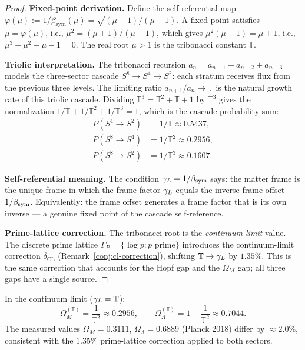 \begin{proof}
\textbf{Fixed-point derivation.}
Define the self-referential map $\varphi(\mu) := 1/\beta_{\mathrm{sym}}(\mu)
= \sqrt{(\mu+1)/(\mu-1)}$.
A fixed point satisfies $\mu = \varphi(\mu)$, i.e.,
$\mu^2 = (\mu+1)/(\mu-1)$, which gives $\mu^2(\mu-1) = \mu+1$, i.e.,
$\mu^3 - \mu^2 - \mu - 1 = 0$.
The real root $\mu > 1$ is the tribonacci constant $\mathbb{T}$.

\textbf{Triolic interpretation.}
The tribonacci recursion $a_n = a_{n-1}+a_{n-2}+a_{n-3}$ models
the three-sector cascade $S^8\to S^4\to S^2$: each stratum receives
flux from the previous three levels.
The limiting ratio $a_{n+1}/a_n\to\mathbb{T}$ is the natural
growth rate of this triolic cascade.
Dividing $\mathbb{T}^3 = \mathbb{T}^2+\mathbb{T}+1$ by $\mathbb{T}^3$
gives the normalization
$1/\mathbb{T}+1/\mathbb{T}^2+1/\mathbb{T}^3 = 1$,
which is the cascade probability sum:
\begin{align*}
  P(S^4\to S^2) &= 1/\mathbb{T} \approx 0.5437, \\
  P(S^8\to S^4) &= 1/\mathbb{T}^2 \approx 0.2956, \\
  P(S^8\to S^2) &= 1/\mathbb{T}^3 \approx 0.1607.
\end{align*}

\textbf{Self-referential meaning.}
The condition $\gamma_L = 1/\beta_{\mathrm{sym}}$ says: the matter frame is the unique frame
in which the frame factor $\gamma_L$ equals the inverse frame offset $1/\beta_{\mathrm{sym}}$.
Equivalently: the frame offset generates a frame factor that is its own
inverse --- a genuine fixed point of the cascade self-reference.

\textbf{Prime-lattice correction.}
The tribonacci root is the \emph{continuum-limit} value.
The discrete prime lattice $\Gamma_P = \{\log p : p\text{ prime}\}$
introduces the continuum-limit correction $\delta_{\mathrm{CL}}$
(Remark~\ref{conj:cl-correction}), shifting $\mathbb{T}\to\gamma_L$
by $1.35\%$.
This is the same correction that accounts for the Hopf gap and the
$\Omega_M$ gap; all three gaps have a single source.
\end{proof}

\begin{corollary}
\label{cor:tribonacci-cosmo}
In the continuum limit ($\gamma_L = \mathbb{T}$):
\[
  \Omega_M^{(\mathbb{T})} = \frac{1}{\mathbb{T}^2} \approx 0.2956,
  \qquad
  \Omega_\Lambda^{(\mathbb{T})} = 1-\frac{1}{\mathbb{T}^2} \approx 0.7044.
\]
The measured values $\Omega_M = 0.3111$, $\Omega_\Lambda = 0.6889$
(Planck 2018) differ by $\approx 2.0\%$, consistent with the
$1.35\%$ prime-lattice correction applied to both sectors.
\end{corollary}

